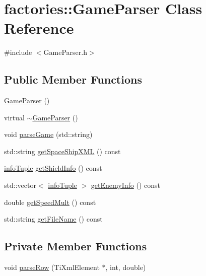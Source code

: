 \hypertarget{classfactories_1_1GameParser}{\section{factories\-:\-:\-Game\-Parser \-Class \-Reference}
\label{d0/dc6/classfactories_1_1GameParser}
}


{\ttfamily \#include $<$\-Game\-Parser.\-h$>$}

\subsection*{\-Public \-Member \-Functions}
\begin{DoxyCompactItemize}
\item 
\hyperlink{classfactories_1_1GameParser_a5489978eb2e4a70c9e11ccba4c0a3eaa}{\-Game\-Parser} ()
\item 
virtual \hyperlink{classfactories_1_1GameParser_aef9939aab10de9f5d822a7c3012205ec}{$\sim$\-Game\-Parser} ()
\item 
void \hyperlink{classfactories_1_1GameParser_a37478c9c37d5b4c1c8710c6fe12c9cf1}{parse\-Game} (std\-::string)
\item 
std\-::string \hyperlink{classfactories_1_1GameParser_ab7c58c48edd369657cdc0ef969c66716}{get\-Space\-Ship\-X\-M\-L} () const 
\item 
\hyperlink{EnemyShipFactory_8h_ac956ecc007fb2927f31ad7a9ab11662c}{info\-Tuple} \hyperlink{classfactories_1_1GameParser_a32c336b1b1c11dc7a090e45516b3208f}{get\-Shield\-Info} () const 
\item 
std\-::vector$<$ \hyperlink{EnemyShipFactory_8h_ac956ecc007fb2927f31ad7a9ab11662c}{info\-Tuple} $>$ \hyperlink{classfactories_1_1GameParser_ae843cd142fb42c3e885652bd97df9745}{get\-Enemy\-Info} () const 
\item 
double \hyperlink{classfactories_1_1GameParser_acdaa0830dbc111796fece6ce1381f12b}{get\-Speed\-Mult} () const 
\item 
std\-::string \hyperlink{classfactories_1_1GameParser_aef3a20c6f2b4cec0fda8bea8150e9bfd}{get\-File\-Name} () const 
\end{DoxyCompactItemize}
\subsection*{\-Private \-Member \-Functions}
\begin{DoxyCompactItemize}
\item 
void \hyperlink{classfactories_1_1GameParser_aa4941f13a1b2c0148a2bb79830ad663f}{parse\-Row} (\-Ti\-Xml\-Element $\ast$, int, double)
\end{DoxyCompactItemize}
